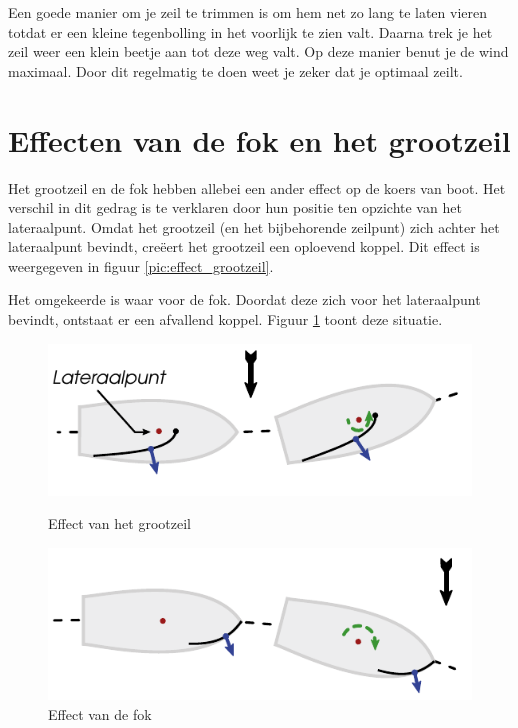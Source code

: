 Een goede manier om je zeil te trimmen is om hem net zo lang te laten vieren totdat er een kleine tegenbolling in het voorlijk te zien valt. Daarna trek je het zeil weer een klein beetje aan tot deze weg valt. Op deze manier benut je de wind maximaal. Door dit regelmatig te doen weet je zeker dat je optimaal zeilt. 

\section{Effecten van de fok en het grootzeil}
Het grootzeil en de fok hebben allebei een ander effect op de koers van boot. Het verschil in dit gedrag is te verklaren door hun positie ten opzichte van het lateraalpunt. Omdat het grootzeil (en het bijbehorende zeilpunt) zich achter het lateraalpunt bevindt, creëert het grootzeil een oploevend koppel. Dit effect is weergegeven in figuur \ref{pic:effect_grootzeil}.

Het omgekeerde is waar voor de fok. Doordat deze zich voor het lateraalpunt bevindt, ontstaat er een afvallend koppel. Figuur \ref{pic:effect_fok} toont deze situatie. 

\begin{figure}[ht]
	\centering
	\begin{minipage}[b]{0.49\textwidth}
		\centering
		\includegraphics[width=\textwidth]{Hoofdstukken/Krachten/pdf/effect_grootzeil.pdf}
		\caption{Effect van het grootzeil}
		\label{pic:effect_grootzeil}
	\end{minipage}
	\hfill
	\begin{minipage}[b]{0.49\textwidth}
		\centering
		\includegraphics[width=\textwidth]{Hoofdstukken/Krachten/pdf/effect_fok.pdf}
		\caption{Effect van de fok}
		\label{pic:effect_fok}
	\end{minipage}
\end{figure}

